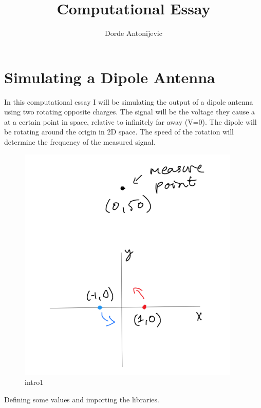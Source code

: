 \documentclass[11pt]{article}
\author{Dorde Antonijevic}
\title{Computational Essay}
\begin{document}
    
    \maketitle
    
    

    
    \hypertarget{simulating-a-dipole-antenna}{%
\section*{Simulating a Dipole
Antenna}\label{simulating-a-dipole-antenna}}

    In this computational essay I will be simulating the output of a dipole
antenna using two rotating opposite charges. The signal will be the
voltage they cause a at a certain point in space, relative to infinitely
far away (V=0). The dipole will be rotating around the origin in 2D
space. The speed of the rotation will determine the frequency of the
measured signal.

    \begin{figure}
\centering
\includegraphics{pics/intro1.png}
\caption{intro1}
\end{figure}

    Defining some values and importing the libraries.
\end{document}
